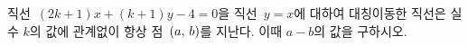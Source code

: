 직선~$(2k+1)x+(k+1)y-4=0$을 직선~$y=x$에 대하여 대칭이동한 직선은 실수 $k$의 값에 관계없이 항상 점~$(a,\mkern3mu b)$를 지난다. 이때 $a-b$의 값을 구하시오.
